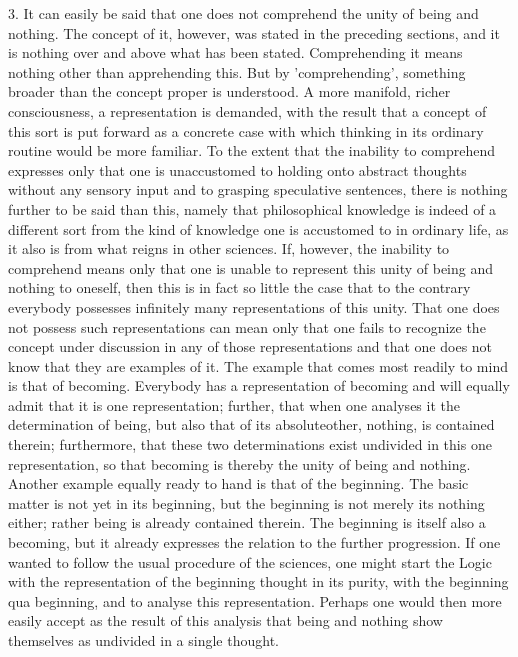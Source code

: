 3. It can easily be said that one does not comprehend
the unity of being and nothing.
The concept of it, however, was stated in the preceding sections,
and it is nothing over and above what has been stated.
Comprehending it means nothing other than apprehending this.
But by 'comprehending', something broader than the concept proper is understood.
A more manifold, richer consciousness, a representation is demanded,
with the result that a concept of this sort is put forward as a concrete case
with which thinking in its ordinary routine would be more familiar.
To the extent that the inability to comprehend expresses only that one is
unaccustomed to holding onto abstract thoughts without any sensory input
and to grasping speculative sentences, there is nothing further to be said
than this, namely that philosophical knowledge is indeed of
a different sort from the kind of knowledge one is accustomed to
in ordinary life, as it also is from what reigns in other sciences.
If, however, the inability to comprehend means only that
one is unable to represent this unity of being and nothing to oneself,
then this is in fact so little the case that to the contrary
everybody possesses infinitely many representations of this unity.
That one does not possess such representations can mean only that
one fails to recognize the concept under discussion in any of
those representations and that one does not know that they are examples of it.
The example that comes most readily to mind is that of becoming.
Everybody has a representation of becoming
and will equally admit that it is one representation;
further, that when one analyses it the determination of being,
but also that of its absoluteother, nothing, is contained therein;
furthermore, that these two determinations exist undivided in this
one representation, so that becoming is thereby the unity of being and nothing.
Another example equally ready to hand is that of the beginning.
The basic matter is not yet in its beginning,
but the beginning is not merely its nothing either;
rather being is already contained therein.
The beginning is itself also a becoming,
but it already expresses the relation to the further progression.
If one wanted to follow the usual procedure of the sciences,
one might start the Logic with the representation of
the beginning thought in its purity, with the beginning qua beginning,
and to analyse this representation.
Perhaps one would then more easily accept as the result of this analysis
that being and nothing show themselves as undivided in a single thought.

